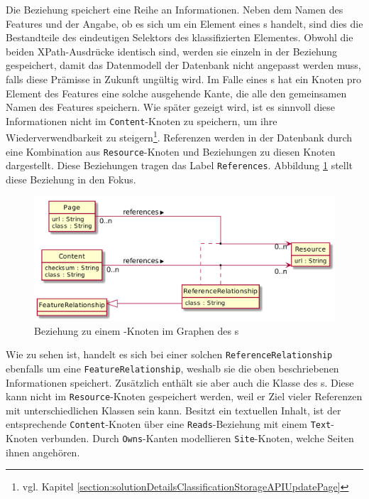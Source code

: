     Die Beziehung speichert eine Reihe an Informationen.
    Neben dem Namen des Features und der Angabe,
    ob es sich um ein Element eines {\collectionFeature}s handelt,
    sind dies die Bestandteile des eindeutigen Selektors des
    klassifizierten Elementes.
    Obwohl die beiden XPath-Ausdrücke identisch sind,
    werden sie einzeln in der Beziehung gespeichert, damit das Datenmodell der Datenbank
    nicht angepasst werden muss, falls diese Prämisse in Zukunft ungültig wird.
    Im Falle eines {\collectionFeature}s hat ein Knoten pro Element des Features eine solche
    ausgehende Kante, die alle den gemeinsamen Namen des Features speichern.
    Wie später gezeigt wird, ist es sinnvoll diese Informationen nicht im \texttt{Content}-Knoten
    zu speichern, um ihre Wiederverwendbarkeit zu
    steigern\footnote{vgl. Kapitel \ref{section:solutionDetailsClassificationStorageAPIUpdatePage}}.
    Referenzen werden in der Datenbank durch eine Kombination aus
    \texttt{Resource}-Knoten und Beziehungen zu diesen Knoten dargestellt.
    Diese Beziehungen tragen das Label \texttt{References}.
    Abbildung \ref{image:dbDataModelResourceRelationship} stellt diese Beziehung in den Fokus.

    \begin{figure}
        \centering
        \includegraphics[scale=\imageScalingFactor]{../resources/db-data-model/resource-relationship.png}
        \caption{Beziehung zu einem {\resource}-Knoten im Graphen des {\classificationStorage}s}
        \label{image:dbDataModelResourceRelationship}
    \end{figure}

    Wie zu sehen ist, handelt es sich bei einer solchen \texttt{ReferenceRelationship} ebenfalls
    um eine \texttt{FeatureRelationship}, weshalb sie die oben beschriebenen Informationen speichert.
    Zusätzlich enthält sie aber auch die Klasse des {}s.
    Diese kann nicht im \texttt{Resource}-Knoten gespeichert werden,
    weil er Ziel vieler Referenzen mit unterschiedlichen Klassen sein kann.
    Besitzt ein {\contentFeature} textuellen Inhalt,
    ist der entsprechende \texttt{Content}-Knoten über eine \texttt{Reads}-Beziehung
    mit einem \texttt{Text}-Knoten verbunden.
    Durch \texttt{Owns}-Kanten modellieren \texttt{Site}-Knoten,
    welche Seiten ihnen angehören.
